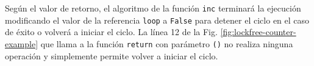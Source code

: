 Según el valor de retorno, el algoritmo de la función \texttt{inc} terminará la ejecución modificando el valor de la referencia \texttt{loop} a \texttt{False} para detener el ciclo en el caso de éxito o volverá a iniciar el ciclo.
La línea 12 de la Fig. \ref{fig:lockfree-counter-example} que llama a la función \texttt{return} con parámetro \texttt{()} no realiza ninguna operación y simplemente permite volver a iniciar el ciclo.





